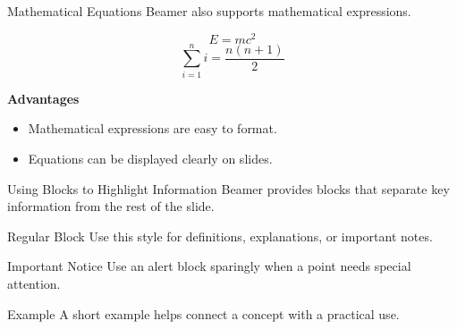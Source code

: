 \documentclass[11pt,aspectratio=43]{beamer}
\begin{document}
\begin{frame}{Mathematical Equations}
  \vspace{0.35cm}
  Beamer also supports mathematical expressions.

  \begin{center}
    \vspace{0.15cm}
    \[
      E = mc^2
    \]
    \vspace{0.08cm}
    \[
      \sum_{i=1}^{n} i = \frac{n(n+1)}{2}
    \]
  \end{center}

  \vspace{0.05cm}
  \textbf{Advantages}
  \begin{itemize}
    \item Mathematical expressions are easy to format.
    \item Equations can be displayed clearly on slides.
  \end{itemize}
\end{frame}


\begin{frame}{Using Blocks to Highlight Information}
  Beamer provides blocks that separate key information from the rest of the slide.
  \vspace{0.15cm}
  \begin{block}{Regular Block}
    Use this style for definitions, explanations, or important notes.
  \end{block}
  \begin{alertblock}{Important Notice}
    Use an alert block sparingly when a point needs special attention.
  \end{alertblock}
  \begin{exampleblock}{Example}
    A short example helps connect a concept with a practical use.
  \end{exampleblock}
\end{frame}
\end{document}
